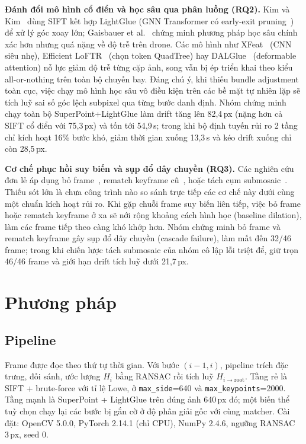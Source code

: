 \documentclass[conference]{IEEEtran}
\begin{document}
\textbf{Đánh đổi mô hình cổ điển và học sâu qua phân luồng (RQ2).} Kim và
Kim~\cite{kim2025} dùng SIFT kết hợp LightGlue (GNN Transformer có early-exit
pruning~\cite{lindenberger2023}) để xử lý góc xoay lớn; Gaisbauer et
al.~\cite{gaisbauer2025} chứng minh phương pháp học sâu chính xác hơn nhưng quá nặng
về độ trễ trên drone. Các mô hình như XFeat~\cite{potlapalli2024} (CNN siêu nhẹ),
Efficient LoFTR~\cite{wang2024} (chọn token QuadTree) hay DALGlue~\cite{dalglue}
(deformable attention) nỗ lực giảm độ trễ từng cặp ảnh, song vẫn bị ép triển khai theo
kiểu all-or-nothing trên toàn bộ chuyến bay. Đáng chú ý, khi thiếu bundle adjustment
toàn cục, việc chạy mô hình học sâu vô điều kiện trên các bề mặt tự nhiên lặp sẽ tích
luỹ sai số góc lệch subpixel qua từng bước danh định. Nhóm chứng minh chạy toàn bộ
SuperPoint+LightGlue làm drift tăng lên 82,4\,px (nặng hơn cả SIFT cổ điển với 75,3\,px)
và tốn tới 54,9\,s; trong khi bộ định tuyến rủi ro 2 tầng chỉ kích hoạt 16\% bước khó,
giảm thời gian xuống 13,3\,s và kéo drift xuống chỉ còn 28,5\,px.

\textbf{Cơ chế phục hồi suy biến và sụp đổ dây chuyền (RQ3).} Các nghiên cứu đơn
lẻ áp dụng bỏ frame~\cite{hwang2026}, rematch keyframe cũ~\cite{li2023}, hoặc tách
cụm submosaic~\cite{dronezaic}. Thiếu sót lớn là chưa công trình nào so sánh trực
tiếp các cơ chế này dưới cùng một chuẩn kích hoạt rủi ro. Khi gặp chuỗi frame suy biến
liên tiếp, việc bỏ frame hoặc rematch keyframe ở xa sẽ nới rộng khoảng cách hình học
(baseline dilation), làm các frame tiếp theo càng khó khớp hơn. Nhóm chứng minh bỏ
frame và rematch keyframe gây sụp đổ dây chuyền (cascade failure), làm mất đến 32/46
frame; trong khi chiến lược tách submosaic của nhóm cô lập lỗi triệt để, giữ trọn
46/46 frame và giới hạn drift tích luỹ dưới 21,7\,px.
\section{Phương pháp}
\subsection{Pipeline}
Frame được đọc theo thứ tự thời gian. Với bước $(i-1,i)$, pipeline trích đặc
trưng, đối sánh, ước lượng $H_i$ bằng RANSAC rồi tích luỹ
$H_{i\to \mathrm{root}}$. Tầng rẻ là SIFT + brute-force với tỉ lệ Lowe, ở
\texttt{max\_side}=640 và \texttt{max\_keypoints}=2000. Tầng mạnh là
SuperPoint + LightGlue trên đúng ảnh 640\,px đó; một biến thể tuỳ chọn chạy lại
các bước bị gắn cờ ở độ phân giải gốc với cùng matcher. Cài đặt: OpenCV 5.0.0,
PyTorch 2.14.1 (chỉ CPU), NumPy 2.4.6, ngưỡng RANSAC 3\,px, seed 0.
\end{document}
